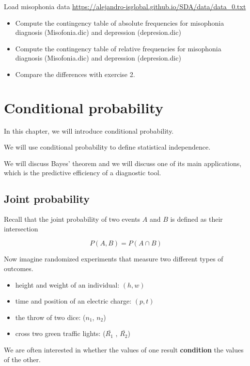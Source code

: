 \documentclass[
]{book}
\begin{document}
Load misophonia data \url{https://alejandro-isglobal.github.io/SDA/data/data_0.txt}

\begin{itemize}
\item
  Compute the contingency table of absolute frequencies for misophonia diagnosis (Misofonia.dic) and depression (depresion.dic)
\item
  Compute the contingency table of relative frequencies for misophonia diagnosis (Misofonia.dic) and depression (depresion.dic)
\item
  Compare the differences with exercise 2.
\end{itemize}

\hypertarget{conditional-probability}{%
\chapter{Conditional probability}\label{conditional-probability}}

In this chapter, we will introduce conditional probability.

We will use conditional probability to define statistical independence.

We will discuss Bayes' theorem and we will discuss one of its main applications, which is the predictive efficiency of a diagnostic tool.

\hypertarget{joint-probability}{%
\section{Joint probability}\label{joint-probability}}

Recall that the joint probability of two events \(A\) and \(B\) is defined as their intersection

\[P( A ,B )=P(A \cap B)\]

Now imagine randomized experiments that measure two different types of outcomes.

\begin{itemize}
\item
  height and weight of an individual: \((h, w)\)
\item
  time and position of an electric charge: \((p, t)\)
\item
  the throw of two dice: (\(n_1\), \(n_2\))
\item
  cross two green traffic lights: (\(\bar{ R_ 1}\) , \(\bar{R_2}\))
\end{itemize}

We are often interested in whether the values of one result \textbf{condition} the values of the other.
\end{document}
